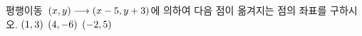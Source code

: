 평행이동~$(x{,}\mkern3mu\mathopen{}y)\longrightarrow(x-5{,}\mkern3mu\mathopen{}y+3)$에 의하여 다음 점이 옮겨지는 점의 좌표를 구하시오.
 $(1{,}\mkern3mu\mathopen{}3)$
 $(4{,}\mkern3mu\mathopen{}-6)$
 $(-2{,}\mkern3mu\mathopen{}5)$
